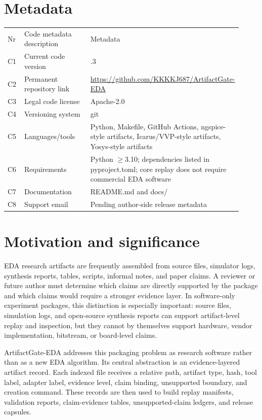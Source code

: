 \documentclass[preprint,12pt]{elsarticle}
\begin{document}
\section*{Metadata}
\begin{tabular}{>{\raggedright\arraybackslash}p{0.08\linewidth}>{\raggedright\arraybackslash}p{0.36\linewidth}>{\raggedright\arraybackslash}p{0.48\linewidth}}
Nr & Code metadata description & Metadata \\
C1 & Current code version & 0.1.3 \\
C2 & Permanent repository link & \url{https://github.com/KKKKJ687/ArtifactGate-EDA} \\
C3 & Legal code license & Apache-2.0 \\
C4 & Versioning system & git \\
C5 & Languages/tools & Python, Makefile, GitHub Actions, ngspice-style artifacts, Icarus/VVP-style artifacts, Yosys-style artifacts \\
C6 & Requirements & Python $\geq$3.10; dependencies listed in pyproject.toml; core replay does not require commercial EDA software \\
C7 & Documentation & README.md and docs/ \\
C8 & Support email & Pending author-side release metadata \\
\end{tabular}

\section{Motivation and significance}
EDA research artifacts are frequently assembled from source files, simulator
logs, synthesis reports, tables, scripts, informal notes, and paper claims. A
reviewer or future author must determine which claims are directly supported by
the package and which claims would require a stronger evidence layer. In
software-only experiment packages, this distinction is especially important:
source files, simulation logs, and open-source synthesis reports can support
artifact-level replay and inspection, but they cannot by themselves support
hardware, vendor implementation, bitstream, or board-level claims.

ArtifactGate-EDA addresses this packaging problem as research software rather
than as a new EDA algorithm. Its central abstraction is an evidence-layered
artifact record. Each indexed file receives a relative path, artifact type,
hash, tool label, adapter label, evidence level, claim binding, unsupported
boundary, and creation command. These records are then used to build replay
manifests, validation reports, claim-evidence tables, unsupported-claim ledgers,
and release capsules.
\end{document}
